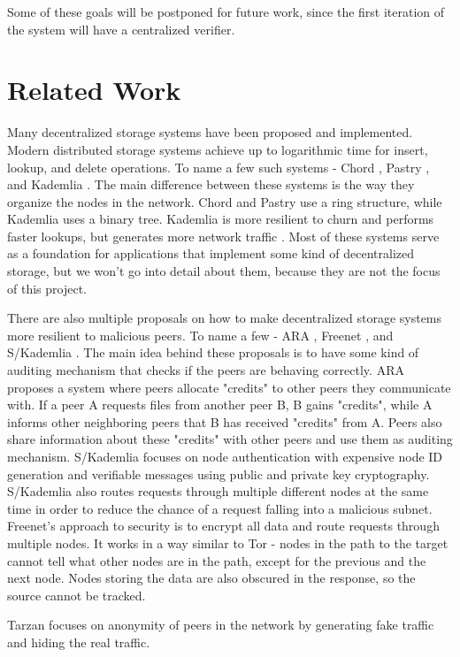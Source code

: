 \documentclass[ twoside,openright,titlepage,numbers=noenddot,headinclude,%
                footinclude=true,cleardoublepage=empty,abstractoff, %
                BCOR=5mm,paper=a4,fontsize=11pt,%
                ngerman,american,%
                ]{scrreprt}
\begin{document}
Some of these goals will be postponed for future work, 
since the first iteration of the system will have a centralized verifier.


\chapter{Related Work}

Many decentralized storage systems have been proposed and implemented.
Modern distributed storage systems achieve up to logarithmic time for insert, lookup, and delete operations.
To name a few such systems - Chord \cite{chord}, Pastry \cite{pastry}, and Kademlia \cite{kademlia}.
The main difference between these systems is the way they organize the nodes in the network.
Chord and Pastry use a ring structure, while Kademlia uses a binary tree.
Kademlia is more resilient to churn and performs faster lookups, but generates more network traffic \cite{kadvschordvspastry}.
Most of these systems serve as a foundation for applications that implement some kind of decentralized storage,
but we won't go into detail about them, because they are not the focus of this project.

There are also multiple proposals on how to make decentralized storage systems more resilient to malicious peers.
To name a few - ARA \cite{ara}, Freenet , and S/Kademlia \cite{skademlia}.
The main idea behind these proposals is to have some kind of auditing mechanism that checks if the peers are behaving correctly.
ARA proposes a system where peers allocate "credits" to other peers they communicate with.
If a peer A requests files from another peer B, B gains "credits", while A informs other neighboring peers
that B has received "credits" from A.
Peers also share information about these "credits" with other peers and use them as auditing mechanism.
S/Kademlia focuses on node authentication with expensive node ID generation and verifiable messages using
public and private key cryptography.
S/Kademlia also routes requests through multiple different nodes at the same time
in order to reduce the chance of a request falling into a malicious subnet.
Freenet's approach to security is to encrypt all data and route requests through multiple nodes.
It works in a way similar to Tor - nodes in the path to the target cannot tell what other nodes are in the path,
except for the previous and the next node.
Nodes storing the data are also obscured in the response, so the source cannot be tracked.

Tarzan focuses on anonymity of peers in the network by generating fake traffic and hiding the real traffic.
\end{document}
